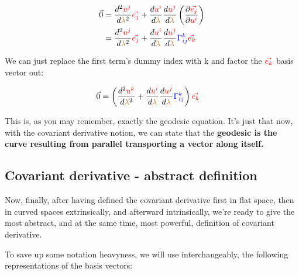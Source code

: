 \begin{align*}
    \vec{0} &= \frac{d^2\begingroup\color{red}u^j\endgroup}{d\begingroup\color{brown}\lambda\endgroup^2}\begingroup\color{red}\vec{e_j}\endgroup + 
    \frac{d\begingroup\color{red}u^i\endgroup}{d\begingroup\color{brown}\lambda\endgroup} \frac{d\begingroup\color{red}u^j\endgroup}{d\begingroup\color{brown}\lambda\endgroup} \left(\frac{\partial \begingroup\color{red}\vec{e_j}\endgroup}{\partial\begingroup\color{red}u^i\endgroup}\right)\\
    &= \frac{d^2\begingroup\color{red}u^j\endgroup}{d\begingroup\color{brown}\lambda\endgroup^2}\begingroup\color{red}\vec{e_j}\endgroup + 
    \frac{d\begingroup\color{red}u^i\endgroup}{d\begingroup\color{brown}\lambda\endgroup} \frac{d\begingroup\color{red}u^j\endgroup}{d\begingroup\color{brown}\lambda\endgroup} \begingroup\color{blue}\Gamma^k_{ij}\endgroup \begingroup\color{red}\vec{e_k}\endgroup
\end{align*}

We can just replace the first term's dummy index with k and factor the $\color{red}\vec{e_k}$ basis vector out:

\begin{align*}
    \vec{0} &= \left(\frac{d^2\begingroup\color{red}u^k\endgroup}{d\begingroup\color{brown}\lambda\endgroup^2} + 
    \frac{d\begingroup\color{red}u^i\endgroup}{d\begingroup\color{brown}\lambda\endgroup} \frac{d\begingroup\color{red}u^j\endgroup}{d\begingroup\color{brown}\lambda\endgroup} \begingroup\color{blue}\Gamma^k_{ij}\endgroup\right) \begingroup\color{red}\vec{e_k}\endgroup
\end{align*}

This is, as you may remember, exactly the geodesic equation. It's just that now, with the covariant derivative notion, we can state that
the \textbf{geodesic is the curve resulting from parallel transporting a vector along itself.}

\subsection{Covariant derivative - abstract definition}

Now, finally, after having defined the covariant derivative first in flat space, then in curved spaces extrinsically, and afterward intrinsically, we're 
ready to give the most abstract, and at the same time, most powerful, definition of covariant derivative.

To save up some notation heavyness, we will use interchangeably, the following representations of the basis vectors:

